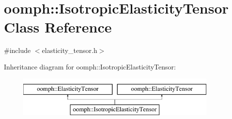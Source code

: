 \hypertarget{classoomph_1_1IsotropicElasticityTensor}{}\section{oomph\+:\+:Isotropic\+Elasticity\+Tensor Class Reference}
\label{classoomph_1_1IsotropicElasticityTensor}


{\ttfamily \#include $<$elasticity\+\_\+tensor.\+h$>$}

Inheritance diagram for oomph\+:\+:Isotropic\+Elasticity\+Tensor\+:\begin{figure}[H]
\begin{center}
\leavevmode
\includegraphics[height=2.000000cm]{classoomph_1_1IsotropicElasticityTensor}
\end{center}
\end{figure}
